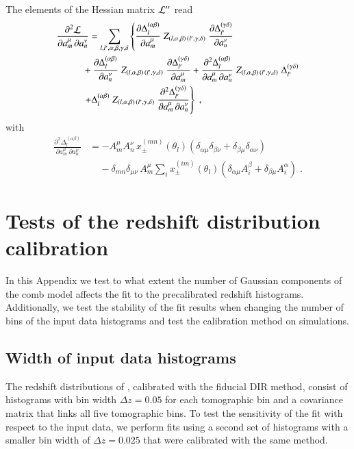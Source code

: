 \documentclass{aa}
\newcommand{\eqa}[1]{\begin{align}   #1 \end{align}}
\newcommand{\br}[1]{\left( #1 \right)}
\newcommand{\nn}{\nonumber}
\begin{document}
\begin{appendix}
The elements of the Hessian matrix ${\cal L^{\prime\prime}}$ read
\eqa{
\label{eq:hessian}
\frac{\partial^2 {\cal L}}{\partial a_m^\mu\, \partial a_n^\nu} &= \sum_{l,l',\alpha,\beta,\gamma,\delta} 
\left\{ 
\frac{\partial \Delta_l^{(\alpha \beta)}}{\partial a_m^\mu}\; Z_{(l,\alpha,\beta) \,  (l',\gamma,\delta)}\; \frac{\partial \Delta_{l'}^{(\gamma \delta)}}{\partial a_n^\nu}  \right. \\ \nn
& \!\!\!\! + \frac{\partial \Delta_l^{(\alpha \beta)}}{\partial a_n^\nu}\; Z_{(l,\alpha,\beta) \,  (l',\gamma,\delta)}\; \frac{\partial \Delta_{l'}^{(\gamma \delta)}}{\partial a_m^\mu} 
+ \frac{\partial^2 \Delta_l^{(\alpha \beta)}}{\partial a_m^\mu\, \partial a_n^\nu}\; Z_{(l,\alpha,\beta) \,  (l',\gamma,\delta)}\; \Delta_{l'}^{(\gamma \delta)} \\ \nn
& \!\!\!\! \left. + \Delta_l^{(\alpha \beta)}\; Z_{(l,\alpha,\beta) \,  (l',\gamma,\delta)}\; \frac{\partial^2 \Delta_{l'}^{(\gamma \delta)}}{\partial a_m^\mu\, \partial a_n^\nu}
\right\}\;,
}
with 
\eqa{
\frac{\partial^2 \Delta_l^{(\alpha \beta)}}{\partial a_m^\mu\, \partial a_n^\nu} &= - A_m^\mu A_n^\nu \, x_\pm^{(mn)}(\theta_l) \br{ \delta_{\alpha \mu} \delta_{\beta \nu} + \delta_{\beta \mu} \delta_{\alpha \nu} }\\ \nn
& ~~~~~ - \delta_{mn} \delta_{\mu \nu}\, A_m^\mu \sum_i x_\pm^{(im)}(\theta_l) \br{\delta_{\alpha \mu} A_i^\beta + \delta_{\beta \mu} A_i^\alpha}\;.
}
\section{Tests of the redshift distribution calibration}
\label{ap:calibration}
In this Appendix we test to what extent the number of Gaussian components of the comb model affects the fit to the precalibrated redshift histograms. Additionally, we test the stability of the fit results when changing the number of bins of the input data histograms and test the calibration method on simulations.
\subsection{Width of input data histograms}
\label{ap:calibration_input}
The redshift distributions of \cite{hildebrandt18}, calibrated with the fiducial DIR method, consist of histograms with bin width $\Delta z = 0.05$ for each tomographic bin and a covariance matrix that links all five tomographic bins. To test the sensitivity of the fit with respect to the input data, we perform fits using a second set of histograms with a smaller bin width of $\Delta z = 0.025$ that were calibrated with the same method. 


\end{appendix}
\end{document}
